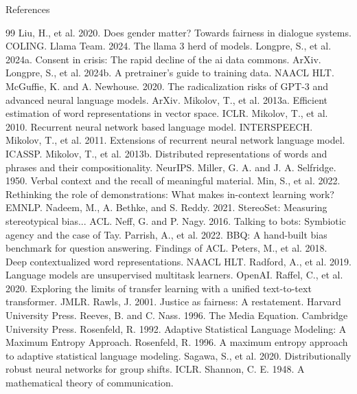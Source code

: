 \documentclass[aspectratio=169]{beamer}
\begin{document}
\begin{frame}[allowframebreaks]{References}
\begin{thebibliography}{99}
     Liu, H., et al. 2020. Does gender matter? Towards fairness in dialogue systems. COLING.
     Llama Team. 2024. The llama 3 herd of models.
     Longpre, S., et al. 2024a. Consent in crisis: The rapid decline of the ai data commons. ArXiv.
     Longpre, S., et al. 2024b. A pretrainer’s guide to training data. NAACL HLT.
     McGuffie, K. and A. Newhouse. 2020. The radicalization risks of GPT-3 and advanced neural language models. ArXiv.
     Mikolov, T., et al. 2013a. Efficient estimation of word representations in vector space. ICLR.
     Mikolov, T., et al. 2010. Recurrent neural network based language model. INTERSPEECH.
     Mikolov, T., et al. 2011. Extensions of recurrent neural network language model. ICASSP.
     Mikolov, T., et al. 2013b. Distributed representations of words and phrases and their compositionality. NeurIPS.
     Miller, G. A. and J. A. Selfridge. 1950. Verbal context and the recall of meaningful material.
     Min, S., et al. 2022. Rethinking the role of demonstrations: What makes in-context learning work? EMNLP.
     Nadeem, M., A. Bethke, and S. Reddy. 2021. StereoSet: Measuring stereotypical bias... ACL.
     Neff, G. and P. Nagy. 2016. Talking to bots: Symbiotic agency and the case of Tay.
     Parrish, A., et al. 2022. BBQ: A hand-built bias benchmark for question answering. Findings of ACL.
     Peters, M., et al. 2018. Deep contextualized word representations. NAACL HLT.
     Radford, A., et al. 2019. Language models are unsupervised multitask learners. OpenAI.
     Raffel, C., et al. 2020. Exploring the limits of transfer learning with a unified text-to-text transformer. JMLR.
     Rawls, J. 2001. Justice as fairness: A restatement. Harvard University Press.
     Reeves, B. and C. Nass. 1996. The Media Equation. Cambridge University Press.
     Rosenfeld, R. 1992. Adaptive Statistical Language Modeling: A Maximum Entropy Approach.
     Rosenfeld, R. 1996. A maximum entropy approach to adaptive statistical language modeling.
     Sagawa, S., et al. 2020. Distributionally robust neural networks for group shifts. ICLR.
     Shannon, C. E. 1948. A mathematical theory of communication.

\end{thebibliography}
\end{frame}
\end{document}
